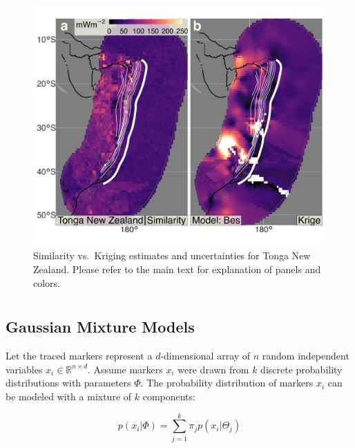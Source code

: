 \begin{figure}
\centering
\includegraphics{assets/figs/chpt3/TongaNewZealandDiffComp.png}
\caption[Similarity vs.~Kriging estimates and uncertainties for Tonga New Zealand]{Similarity vs.~Kriging estimates and uncertainties for Tonga New Zealand. Please refer to the main text for explanation of panels and colors.}
\end{figure}

\cleardoublepage


\hypertarget{section-2}{%
\chapter{}\label{section-2}}

\hypertarget{gmm}{%
\section{Gaussian Mixture Models}\label{gmm}}

Let the traced markers represent a \(d\)-dimensional array of \(n\) random independent variables \(x_i \in \mathbb{R}^{n \times d}\). Assume markers \(x_i\) were drawn from \(k\) discrete probability distributions with parameters \(\Phi\). The probability distribution of markers \(x_i\) can be modeled with a mixture of \(k\) components:

\begin{equation}
  p(x_i | \Phi) = \sum_{j=1}^k \pi_j p(x_i | \Theta_j)
  \label{eq:gmix}
\end{equation}

